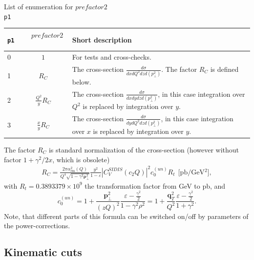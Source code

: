 \documentclass[prd,nofootinbib,eqsecnum,final]{revtex4}
\renewcommand{\(}{\left(}
\renewcommand{\)}{\right)}
\renewcommand{\[}{\left[}
\renewcommand{\]}{\right]}
\renewcommand{\vec}[1]{\bm{#1}}
\begin{document}
\begin{center}
List of enumeration for $prefactor2$
\\
\texttt{p1}
\\
\begin{tabular}{||l|c||p{12cm}||}
\hline\hline
\texttt{p1} & ~~$prefactor2$~~&  Short description 
\\\hline
0 & $1$ & For tests and cross-checks.
\\\hline
1 & $R_C$ & The cross-section $\frac{d\sigma}{dx dQ^2 dz d(p_\perp^2)}$. The factor $R_C$ is defined below.
\\\hline
2 & $\frac{Q^2}{y} R_C$& The cross-section $\frac{d\sigma}{dx dy dz d(p_\perp^2)}$, in this case integration over $Q^2$ is replaced by integration over $y$.
\\\hline
3 & $\frac{x}{y} R_C$ & The cross-section $\frac{d\sigma}{dy dQ^2 dz d(p_\perp^2)}$, in this case integration over $x$ is replaced by integration over $y$.
\\\hline\hline
\end{tabular}
\end{center}
The factor $R_C$ is standard normalization of the cross-section (however without factor $1+\gamma^2/2x$, which is obsolete)
\begin{eqnarray}
R_C=\frac{2\pi \alpha_{\text{em}}^2(Q)}{Q^4\sqrt{1-\gamma^2 \vec \rho_\perp^2}}\frac{y^2}{1-\varepsilon}|C_V^{SIDIS}(c_2Q)|^2 c^{(un)}_0 R_t~~\text{[pb/GeV$^2$]},
\end{eqnarray}
with $R_t=0.3893379\times 10^9$ the transformation factor from GeV to pb, and 
$$
c_0^{(un)}=1+\frac{\vec p_\perp^2}{(zQ)^2}\frac{\varepsilon-\frac{\gamma^2}{2}}{1-\gamma^2\rho^2}
=1+\frac{\vec q_T^2}{Q^2}\frac{\varepsilon-\frac{\gamma^2}{2}}{1+\gamma^2}
.
$$
Note, that different parts of this formula can be switched on/off by parameters of the power-corrections.

\subsection{Kinematic cuts}
\label{TMDXs:cuts}
\end{document}
